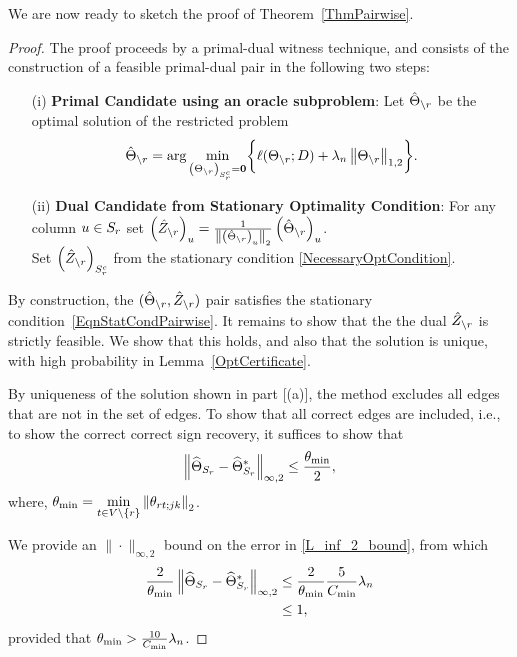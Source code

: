 We are now ready to sketch the proof of Theorem~\ref{ThmPairwise}.
\begin{proof}
\vskip0.05in
 The proof proceeds by a primal-dual witness technique, and consists of the construction of a feasible primal-dual pair in the following two steps:
\begin{itemize}
\item [(i)] {\bf Primal Candidate using an oracle subproblem}: Let $\hat{\Theta}_{\backslash r}$ be the optimal solution of the restricted problem
\begin{equation}
\label{OracleEqnPairwiseGroup}
\hat{\Theta}_{\backslash r}=\arg\min_{\left(\Theta_{\backslash r}\right)_{S_{r}^c}=\mathbf{0}} \biggr\{ \ell(\Theta_{\backslash r}; D) +
	\lambda_n \left\|\Theta_{\backslash r}\right\|_{1,2}
	\biggr\}.
\end{equation}

\item [(ii)] {\bf Dual Candidate from Stationary Optimality Condition}: 
For any column $u\in S_{r}$ set $\left(\hat{Z}_{\backslash r}\right)_{u}=\frac{1}{\left\|\left(\hat{\Theta}_{\backslash r}\right)_u\right\|_2}\left(\hat{\Theta}_{\backslash r}\right)_u$.\\
Set $\left(\hat{Z}_{\backslash r}\right)_{S_{r}^c}$ from the stationary condition \eqref{NecessaryOptCondition}.
\end{itemize}

By construction, the $(\hat{\Theta}_{\backslash r}, \hat{Z}_{\backslash r})$ pair satisfies the stationary condition~\eqref{EqnStatCondPairwise}. It remains to show that the the dual 
$\hat{Z}_{\backslash r}$ is strictly feasible. We show that this holds, and also that the solution is unique, with high probability in Lemma~\ref{OptCertificate}.

 By uniqueness of the solution shown in part [(a)], the method excludes all edges that are not in the set of edges. To show that all correct edges are included, i.e., to show the correct correct sign recovery, it suffices to show that
\begin{equation}
\left\|\widehat{\Theta}_{S_{r}}-\widehat{\Theta}^*_{S_{r}}\right\|_{\infty,2} \leq\frac{\theta_{\min}}{2},
\nonumber
\end{equation} 
where, $\displaystyle\theta_{\min}=\min_{t\in V\backslash\{r\}}\left\|\theta_{r t;jk}\right\|_{2}$. 

We provide an $\|\cdot\|_{\infty,2}$ bound on the error in \eqref{L_inf_2_bound}, from which
\begin{equation}
\begin{aligned}
\frac{2}{\theta_{\min}}\left\|\widehat{\Theta}_{S_{r}}-\widehat{\Theta}^*_{S_{r}}\right\|_{\infty,2}
&\leq\frac{2}{\theta_{\min}}\frac{5}{C_{\min}}\lambda_n\\
&\leq 1,
\end{aligned}
\nonumber
\end{equation}
provided that $\theta_{\min}>\frac{10}{C_{\min}}\lambda_n$.

\end{proof}
